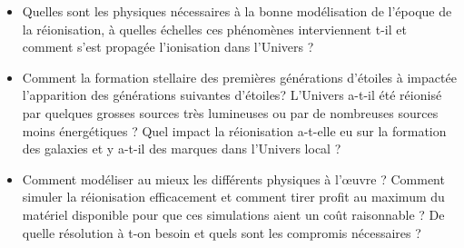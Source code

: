 %
%
%

\begin{itemize}
\item Quelles sont les physiques nécessaires à la bonne modélisation de l'époque de la réionisation, à quelles échelles ces phénomènes interviennent t-il et comment s'est propagée l'ionisation dans l'Univers ?
\item Comment la formation stellaire des premières générations d'étoiles à impactée l'apparition des générations suivantes d'étoiles? 
L'Univers a-t-il été réionisé par quelques grosses sources très lumineuses ou par de nombreuses sources moins énergétiques ?
Quel impact la réionisation a-t-elle eu sur la formation des galaxies et y a-t-il des marques dans l'Univers local ?
\item Comment modéliser au mieux les différents physiques à l’œuvre ?
Comment simuler la réionisation efficacement et comment tirer profit au maximum du matériel disponible pour que ces simulations aient un coût raisonnable ?
De quelle résolution à t-on besoin et quels sont les compromis nécessaires ?
\end{itemize}



